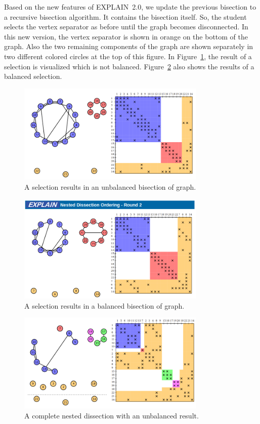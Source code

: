 \documentclass[12pt, twoside,a4paper,toc=bibliography]{scrbook}
\begin{document}
Based on the new features of \mbox{EXPLAIN 2.0}, we update the previous
bisection to a recursive bisection algorithm.
It contains the bisection itself. So, the student selects the vertex separator
as before until the graph becomes disconnected.
In this new version, the vertex separator is shown in orange on the bottom
of the graph. Also the two remaining components of the graph are shown separately
in two different colored circles at the top of this figure.
In Figure~\ref{bad_bisection}, the result of a selection is visualized which
is not balanced.
Figure~\ref{good_bisection} also shows the results of a balanced selection.

\begin{figure}
\centering
\includegraphics[width=0.8\textwidth]{bad_bisection}
\caption{A selection results in an unbalanced bisection of graph.}
\label{bad_bisection}
\end{figure}

\begin{figure}
\centering
\includegraphics[width=0.8\textwidth]{good_bisection}
\caption{A selection results in a balanced bisection of graph.}
\label{good_bisection}
\end{figure}

\begin{figure}
\centering
\includegraphics[width=0.8\textwidth]{bad_disection}
\caption{A complete nested dissection with an unbalanced result.}
\label{bad_disection}
\end{figure}
\end{document}
